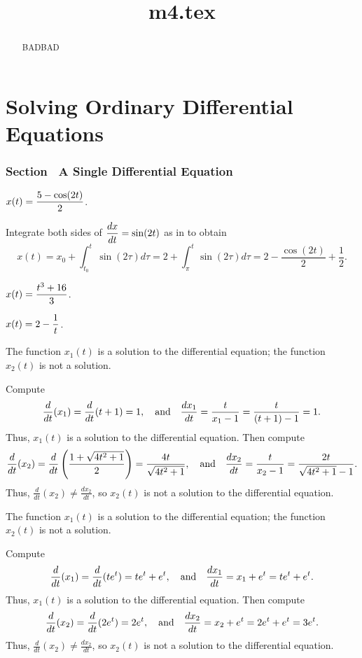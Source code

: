 \documentclass{ximera}
\title{m4.tex}
\begin{document}
\begin{abstract}
BADBAD
\end{abstract}
\maketitle

\chapter{Solving Ordinary Differential Equations}

\subsection*{Section~\protect{\ref{S:growthmodels}} A Single Differential
Equation}

\ans $\displaystyle x(t) = \frac{5 - \cos(2t)}{2}$.

\soln Integrate both sides of $\displaystyle\frac{dx}{dt} = \sin(2t)$ as in
 to obtain
\[
x(t) = x_0 + \int_{t_0}^{t}\sin(2\tau)d\tau =
2 + \int_{\pi}^{t}\sin(2\tau)d\tau = 2 - \frac{\cos(2t)}{2} +
\frac{1}{2}.
\]

 $\displaystyle x(t) = \frac{t^3 + 16}{3}$.

 $\displaystyle x(t) = 2 - \frac{1}{t}$.

\ans The function $x_1(t)$ is a solution to the differential equation;
the function $x_2(t)$ is not a solution.

\soln Compute
\[
\frac{d}{dt}(x_1) = \frac{d}{dt}(t + 1) = 1, \quad\mbox{and}\quad
\frac{dx_1}{dt} = \frac{t}{x_1 - 1} = \frac{t}{(t + 1) - 1} = 1.
\]
Thus, $x_1(t)$ is a solution to the differential equation.  Then compute
\[
\frac{d}{dt}(x_2) = \frac{d}{dt}\left(\frac{1 + \sqrt{4t^2 + 1}}{2}\right)
= \frac{4t}{\sqrt{4t^2 + 1}}, \quad\mbox{and}\quad
\frac{dx_2}{dt} = \frac{t}{x_2 - 1} = \frac{2t}{\sqrt{4t^2 + 1} - 1}.
\]
Thus, $\frac{d}{dt}(x_2) \neq \frac{dx_2}{dt}$, so $x_2(t)$ is not a
solution to the differential equation.

\newpage
{}
\ans The function $x_1(t)$ is a solution to the differential equation;
the function $x_2(t)$ is not a solution.

\soln Compute
\[
\frac{d}{dt}(x_1) = \frac{d}{dt}(te^t) = te^t + e^t, \quad\mbox{and}\quad
\frac{dx_1}{dt} = x_1 + e^t = te^t + e^t.
\]
Thus, $x_1(t)$ is a solution to the differential equation.  Then compute
\[
\frac{d}{dt}(x_2) = \frac{d}{dt}(2e^t) = 2e^t, \quad\mbox{and}\quad
\frac{dx_2}{dt} = x_2 + e^t = 2e^t + e^t = 3e^t.
\]
Thus, $\frac{d}{dt}(x_2) \neq \frac{dx_2}{dt}$, so $x_2(t)$ is not a
solution to the differential equation.
\end{document}
